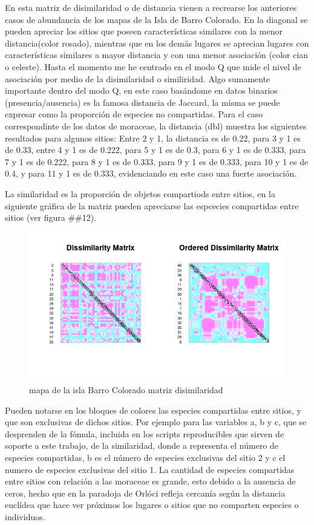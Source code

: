\documentclass[11pt,]{article}
\begin{document}
En esta matriz de disimilaridad o de distancia vienen a recrearse los
anteriores casos de abundancia de los mapas de la Isla de Barro
Colorado. En la diagonal se pueden apreciar los sitios que poseen
características similares con la menor distancia(color rosado), mientras
que en los demás lugares se aprecian lugares con características
similares a mayor distancia y con una menor asociación (color cian o
celeste). Hasta el momento me he centrado en el modo Q que mide el nivel
de asociación por medio de la disimilaridad o similiridad. Algo
sumamente importante dentro del modo Q, en este caso basándome en datos
binarios (presencia/ausencia) es la famosa distancia de Jaccard, la
misma se puede expresar como la proporción de especies no compartidas.
Para el caso correspondinte de los datos de moraceae, la distancia (dbl)
muestra los siguientes resultados para algunos sitios: Entre 2 y 1, la
distancia es de 0.22, para 3 y 1 es de 0.33, entre 4 y 1 es de 0.222,
para 5 y 1 es de 0.3, para 6 y 1 es de 0.333, para 7 y 1 es de 0.222,
para 8 y 1 es de 0.333, para 9 y 1 es de 0.333, para 10 y 1 es de 0.4, y
para 11 y 1 es de 0.333, evidenciando en este caso una fuerte
asociación.

La similaridad es la proporción de objetos compartiods entre sitios, en
la siguiente gráfica de la matriz pueden apreciarse las espcecies
compartidas entre sitios (ver figura \#\#12).

\begin{figure}
\centering
\includegraphics[width=1.00000\textwidth]{matriz_similaridad.png}
\caption{mapa de la isla Barro Colorado matriz disimilaridad
\label{fig:bci_map}}
\end{figure}

Pueden notarse en los bloques de colores las especies compartidas entre
sitios, y que son exclusivas de dichos sitios. Por ejemplo para las
variables a, b y c, que se desprenden de la fómula, incluida en los
scripts reproducibles que sirven de soporte a este trabajo, de la
similaridad, donde a representa el número de especies compartidas, b es
el número de especies exclusivas del sitio 2 y c el numero de especies
exclusivas del sitio 1. La cantidad de especies compartidas entre sitios
con relación a las moraceae es grande, esto debido a la ausencia de
ceros, hecho que en la paradoja de Orlóci refleja cercanía según la
distancia euclídea que hace ver próximos los lugares o sitios que no
comparten especies o individuos.
\end{document}

